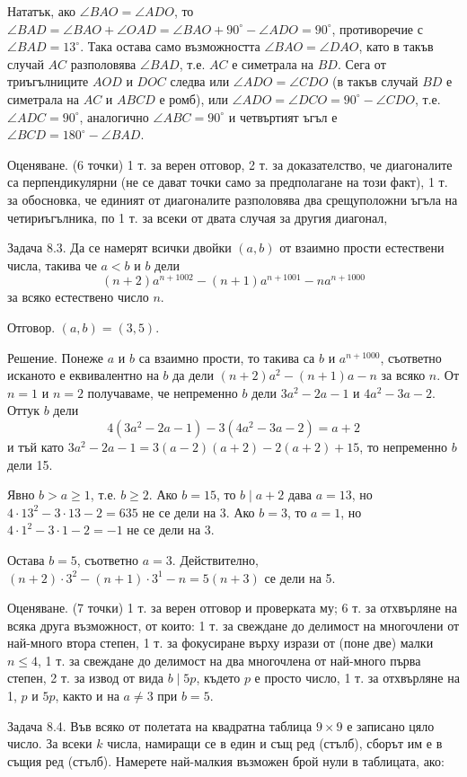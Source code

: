 Нататък, ако $\angle BAO=\angle ADO$, то $\angle BAD=\angle BAO+\angle OAD=\angle BAO+90^\circ-\angle ADO=90^\circ$, противоречие с $\angle BAD=13^\circ$. Така остава само възможността $\angle BAO=\angle DAO$, като в такъв случай $AC$ разполовява $\angle BAD$, т.е. $AC$ е симетрала на $BD$. Сега от триъгълниците $AOD$ и $DOC$ следва или $\angle ADO=\angle CDO$ (в такъв случай $BD$ е симетрала на $AC$ и $ABCD$ е ромб), или $\angle ADO=\angle DCO=90^\circ-\angle CDO$, т.е. $\angle ADC=90^\circ$, аналогично $\angle ABC=90^\circ$ и четвъртият ъгъл е $\angle BCD=180^\circ-\angle BAD$.

Оценяване. (6 точки) 1 т. за верен отговор, 2 т. за доказателство, че диагоналите са перпендикулярни (не се дават точки само за предполагане на този факт), 1 т. за обосновка, че единият от диагоналите разполовява два срещуположни ъгъла на четириъгълника, по 1 т. за всеки от двата случая за другия диагонал,

Задача 8.3. Да се намерят всички двойки $(a,b)$ от взаимно прости естествени числа, такива че $a<b$ и $b$ дели
$$
(n+2)a^{n+1002}-(n+1)a^{n+1001}-na^{n+1000}
$$
за всяко естествено число $n$.

Отговор. $(a,b)=(3,5)$.

Решение. Понеже $a$ и $b$ са взаимно прости, то такива са $b$ и $a^{n+1000}$, съответно исканото е еквивалентно на $b$ да дели $(n+2)a^2-(n+1)a-n$ за всяко $n$. От $n=1$ и $n=2$ получаваме, че непременно $b$ дели $3a^2-2a-1$ и $4a^2-3a-2$. Оттук $b$ дели
$$
4(3a^2-2a-1)-3(4a^2-3a-2)=a+2
$$
и тъй като $3a^2-2a-1=3(a-2)(a+2)-2(a+2)+15$, то непременно $b$ дели 15.

Явно $b>a\ge1$, т.е. $b\ge2$. Ако $b=15$, то $b\mid a+2$ дава $a=13$, но $4\cdot13^2-3\cdot13-2=635$ не се дели на 3. Ако $b=3$, то $a=1$, но $4\cdot1^2-3\cdot1-2=-1$ не се дели на 3.

Остава $b=5$, съответно $a=3$. Действително, $(n+2)\cdot3^2-(n+1)\cdot3^1-n=5(n+3)$ се дели на 5.

Оценяване. (7 точки) 1 т. за верен отговор и проверката му; 6 т. за отхвърляне на всяка друга възможност, от които: 1 т. за свеждане до делимост на многочлени от най-много втора степен, 1 т. за фокусиране върху изрази от (поне две) малки $n\le4$, 1 т. за свеждане до делимост на два многочлена от най-много първа степен, 2 т. за извод от вида $b\mid5p$, където $p$ е просто число, 1 т. за отхвърляне на 1, $p$ и $5p$, както и на $a\ne3$ при $b=5$.

Задача 8.4. Във всяко от полетата на квадратна таблица $9\times9$ е записано цяло число. За всеки $k$ числа, намиращи се в един и същ ред (стълб), сборът им е в същия ред (стълб). Намерете най-малкия възможен брой нули в таблицата, ако:

